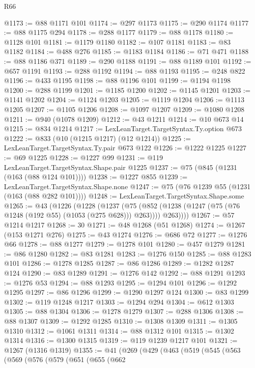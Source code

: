 \begin{lexlean}{R66}
\begin{coremodule}
@1173 := @88 @1171 @101
@1174 := @297 @1173
@1175 := @290 @1174
@1177 := @88 @1175 @294
@1178 := @288 @1177
@1179 := @88 @1178
@1180 := @1128 @101
@1181 := @1179 @1180
@1182 := @107 @1181
@1183 := @83 @1182
@1184 := @488 @276
@1185 := @1183 @1184
@1186 := @71 @471
@1188 := @88 @1186 @371
@1189 := @290 @1188
@1191 := @88 @1189 @101
@1192 := @657 @1191
@1193 := @288 @1192
@1194 := @88 @1193
@1195 := @248 @822
@1196 := @433 @1195
@1198 := @88 @1196 @101
@1199 := @1194 @1198
@1200 := @288 @1199
@1201 := @1185 @1200
@1202 := @1145 @1201
@1203 := @1141 @1202
@1204 := @1124 @1203
@1205 := @1119 @1204
@1206 := @1113 @1205
@1207 := @1105 @1206
@1208 := @1097 @1207
@1209 := @1080 @1208
@1211 := @940 (@1078 @1209)
@1212 := @43 @1211
@1214 := @10 @673 @14
@1215 := @834 @1214
@1217 := LexLeanTarget.TargetSyntax.Ty.option @673
@1222 := @833 (@10 (@1215 @1217) (@12 @1214))
@1225 := LexLeanTarget.TargetSyntax.Ty.pair @673 @122
@1226 := @1222 @1225
@1227 := @69 @1225
@1228 := @1227 @99
@1231 := @119 LexLeanTarget.TargetSyntax.Shape.pair @1225
@1237 := @75 (@845 (@1231 (@163 (@88 @124 @101))))
@1238 := @1227 @855
@1239 := LexLeanTarget.TargetSyntax.Shape.none
@1247 := @75 (@76 @1239 @55 (@1231 (@163 (@88 @282 @101))))
@1248 := LexLeanTarget.TargetSyntax.Shape.some
@1265 := @43
    (@1226
      (@1228
        (@1237
          (@75 (@852 (@1238 (@1247 (@75 (@76 @1248 (@192 @55) (@1053 (@275 @628))) @263)))) @263))))
@1267 := @57 @1214 @1217
@1268 := 30
@1271 := @48 @1268 (@51 @1268)
@1274 := @1267 (@153 @1271 @276)
@1275 := @43 @1274
@1276 := @686 @72
@1277 := @1276 @66
@1278 := @88 @1277
@1279 := @1278 @101
@1280 := @457 @1279
@1281 := @86 @1280
@1282 := @83 @1281
@1283 := @1276 @150
@1285 := @88 @1283 @101
@1286 := @1278 @1285
@1287 := @86 @1286
@1289 := @1282 @1287 @124
@1290 := @83 @1289
@1291 := @1276 @142
@1292 := @88 @1291
@1293 := @1276 @53
@1294 := @88 @1293
@1295 := @1294 @101
@1296 := @1292 @1295
@1297 := @86 @1296
@1299 := @1290 @1297 @124
@1300 := @83 @1299
@1302 := @119 @1248 @1217
@1303 := @1294 @294
@1304 := @612 @1303
@1305 := @88 @1304
@1306 := @1278 @1279
@1307 := @288 @1306
@1308 := @88 @1307
@1309 := @1292 @1285
@1310 := @1308 @1309
@1311 := @1305 @1310
@1312 := @1061 @1311
@1314 := @88 @1312 @101
@1315 := @1302 @1314
@1316 := @1300 @1315
@1319 := @119 @1239 @1217 @101
@1321 := @1267 (@1316 @1319)
@1355 := @41
    (@269
      (@429
        (@463
          (@519
            (@545
              (@563
                (@569
                  (@576
                    (@579
                      (@651
                        (@655
                          (@662

\end{coremodule}
\end{lexlean}
